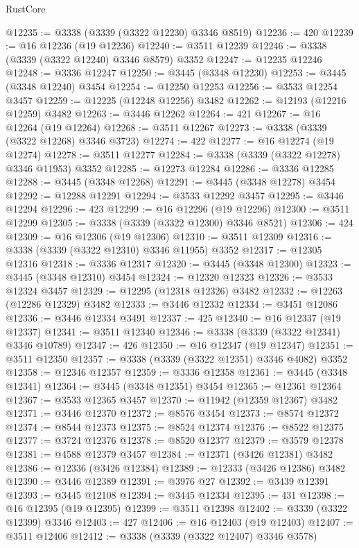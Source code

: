 \begin{lexlean}{RustCore}
\begin{coremodule}
@12235 := @3338 (@3339 (@3322 @12230) @3346 @8519)
@12236 := 420
@12239 := @16 @12236 (@19 @12236)
@12240 := @3511 @12239
@12246 := @3338 (@3339 (@3322 @12240) @3346 @8579) @3352
@12247 := @12235 @12246
@12248 := @3336 @12247
@12250 := @3445 (@3348 @12230)
@12253 := @3445 (@3348 @12240) @3454
@12254 := @12250 @12253
@12256 := @3533 @12254 @3457
@12259 := @12225 (@12248 @12256) @3482
@12262 := @12193 (@12216 @12259) @3482
@12263 := @3446 @12262
@12264 := 421
@12267 := @16 @12264 (@19 @12264)
@12268 := @3511 @12267
@12273 := @3338 (@3339 (@3322 @12268) @3346 @3723)
@12274 := 422
@12277 := @16 @12274 (@19 @12274)
@12278 := @3511 @12277
@12284 := @3338 (@3339 (@3322 @12278) @3346 @11953) @3352
@12285 := @12273 @12284
@12286 := @3336 @12285
@12288 := @3445 (@3348 @12268)
@12291 := @3445 (@3348 @12278) @3454
@12292 := @12288 @12291
@12294 := @3533 @12292 @3457
@12295 := @3446 @12294
@12296 := 423
@12299 := @16 @12296 (@19 @12296)
@12300 := @3511 @12299
@12305 := @3338 (@3339 (@3322 @12300) @3346 @8521)
@12306 := 424
@12309 := @16 @12306 (@19 @12306)
@12310 := @3511 @12309
@12316 := @3338 (@3339 (@3322 @12310) @3346 @11955) @3352
@12317 := @12305 @12316
@12318 := @3336 @12317
@12320 := @3445 (@3348 @12300)
@12323 := @3445 (@3348 @12310) @3454
@12324 := @12320 @12323
@12326 := @3533 @12324 @3457
@12329 := @12295 (@12318 @12326) @3482
@12332 := @12263 (@12286 @12329) @3482
@12333 := @3446 @12332
@12334 := @3451 @12086
@12336 := @3446 @12334 @3491
@12337 := 425
@12340 := @16 @12337 (@19 @12337)
@12341 := @3511 @12340
@12346 := @3338 (@3339 (@3322 @12341) @3346 @10789)
@12347 := 426
@12350 := @16 @12347 (@19 @12347)
@12351 := @3511 @12350
@12357 := @3338 (@3339 (@3322 @12351) @3346 @4082) @3352
@12358 := @12346 @12357
@12359 := @3336 @12358
@12361 := @3445 (@3348 @12341)
@12364 := @3445 (@3348 @12351) @3454
@12365 := @12361 @12364
@12367 := @3533 @12365 @3457
@12370 := @11942 (@12359 @12367) @3482
@12371 := @3446 @12370
@12372 := @8576 @3454
@12373 := @8574 @12372
@12374 := @8544 @12373
@12375 := @8524 @12374
@12376 := @8522 @12375
@12377 := @3724 @12376
@12378 := @8520 @12377
@12379 := @3579 @12378
@12381 := @4588 @12379 @3457
@12384 := @12371 (@3426 @12381) @3482
@12386 := @12336 (@3426 @12384)
@12389 := @12333 (@3426 @12386) @3482
@12390 := @3446 @12389
@12391 := @3976 @27
@12392 := @3439 @12391
@12393 := @3445 @12108
@12394 := @3445 @12334
@12395 := 431
@12398 := @16 @12395 (@19 @12395)
@12399 := @3511 @12398
@12402 := @3339 (@3322 @12399) @3346
@12403 := 427
@12406 := @16 @12403 (@19 @12403)
@12407 := @3511 @12406
@12412 := @3338 (@3339 (@3322 @12407) @3346 @3578)

\end{coremodule}
\end{lexlean}

